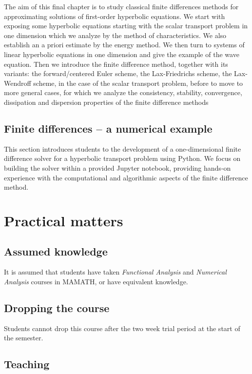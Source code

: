 \documentclass{article}
\begin{document}
The aim of this final chapter is to study classical finite differences
methods for approximating solutions of first-order hyperbolic equations. We
start with exposing some hyperbolic equations starting with the scalar
transport problem in one dimension which we analyze by the method of
characteristics. We also establish an a priori estimate by the energy method.
We then turn to systems of linear hyperbolic equations in one dimension and
give the example of  the wave equation. Then we introduce the finite
difference method, together with its variants: the forward/centered Euler
scheme, the Lax-Friedrichs scheme, the Lax-Wendroff scheme, in the case of the
scalar transport problem, before to move to more general cases, for which we
analyze the consistency, stability, convergence, dissipation and dispersion
properties of the finite difference methods 

\subsection{Finite differences -- a numerical example}

This section introduces students to the development of a one-dimensional finite
difference solver for a hyperbolic transport problem using Python. We focus on
building the solver within a provided Jupyter notebook, providing hands-on
experience with the computational and algorithmic aspects of the finite
difference method.

\section{Practical matters}

\subsection{Assumed knowledge}

It is assumed that students have taken \emph{Functional Analysis} and
\emph{Numerical Analysis} courses in MAMATH, or have equivalent knowledge.

\subsection{Dropping the course}

Students cannot drop this course after the two week trial period at the start
of the semester.

\subsection{Teaching}
\end{document}
